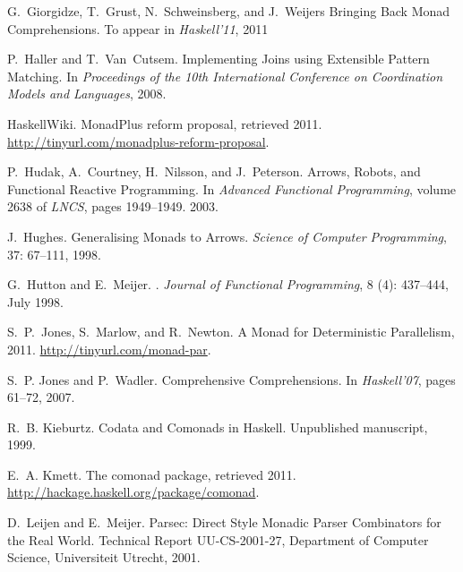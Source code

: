 \documentclass{sigplanconf}
\begin{document}
\begin{thebibliography}{37}
G.~Giorgidze, T.~Grust, N.~Schweinsberg, and J.~Weijers
\newblock Bringing Back Monad Comprehensions.
\newblock To appear in \emph{Haskell'11}, 2011

P.~Haller and T.~Van~Cutsem.
\newblock Implementing {J}oins using {E}xtensible {P}attern {M}atching.
\newblock In \emph{Proceedings of the 10th {I}nternational {C}onference on
  {C}oordination {M}odels and {L}anguages}, 2008.

HaskellWiki.
\newblock MonadPlus reform proposal, retrieved 2011.
\newblock \url{http://tinyurl.com/monadplus-reform-proposal}.

P.~Hudak, A.~Courtney, H.~Nilsson, and J.~Peterson.
\newblock Arrows, Robots, and Functional Reactive Programming.
\newblock In \emph{Advanced Functional Programming}, volume 2638 of
  \emph{LNCS}, pages 1949--1949. 2003.

J.~Hughes.
\newblock Generalising Monads to Arrows.
\newblock \emph{Science of Computer Programming}, 37: 67--111, 1998.

G.~Hutton and E.~Meijer.
.
\newblock \emph{Journal of Functional Programming}, 8 (4):
  437--444, July 1998.

S.~P.~Jones, S.~Marlow, and R.~Newton.
\newblock A Monad for Deterministic Parallelism, 2011.
\newblock \url{http://tinyurl.com/monad-par}.

S.~P. Jones and P.~Wadler.
\newblock Comprehensive Comprehensions.
\newblock In \emph{Haskell'07}, pages 61--72, 2007.

R.~B. Kieburtz.
\newblock Codata and Comonads in Haskell.
\newblock Unpublished manuscript, 1999.

E.~A. Kmett.
\newblock The comonad package, retrieved 2011.
\newblock \url{http://hackage.haskell.org/package/comonad}.

D.~Leijen and E.~Meijer.
\newblock Parsec: Direct Style Monadic Parser Combinators for the Real World.
\newblock Technical Report UU-CS-2001-27, Department of Computer Science,
  Universiteit Utrecht, 2001.


\end{thebibliography}
\end{document}
